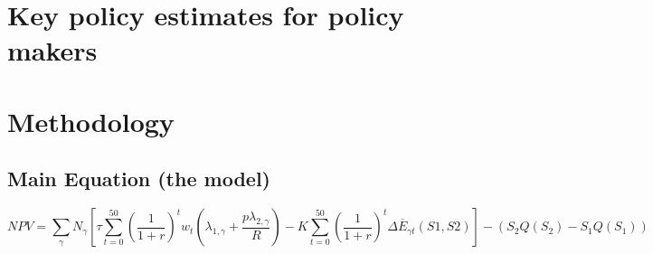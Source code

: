 \documentclass[]{article}
\begin{document}
\hypertarget{key-policy-estimates-for-policy-makers}{%
\section{Key policy estimates for policy
makers}\label{key-policy-estimates-for-policy-makers}}

\hypertarget{methodology}{%
\section{Methodology}\label{methodology}}

\hypertarget{main-equation-the-model}{%
\subsection{Main Equation (the model)}\label{main-equation-the-model}}

\begin{equation}
NPV =  \sum_{\gamma} N_{\gamma} \left[
\tau \sum_{t=0}^{50} \left( \frac{1}{1 + r}\right)^{t} w_{t}
\left( \lambda_{1, \gamma} + \frac{p \lambda_{2, \gamma}}{R} \right) -
K \sum_{t=0}^{50} \left( \frac{1}{1 + r}\right)^{t} \Delta \overline{E}_{\gamma t}(S1,S2)
\right] - \left( S_{2}Q(S_{2}) - S_{1}Q(S_{1}) \right)
\label{eq:1}
\tag{1}
\end{equation}
\end{document}
